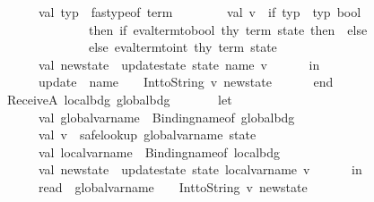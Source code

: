 \begin{isabellebody}
\ \ \ \ \ \ \ \ val\ typ\ {\isacharequal}{\kern0pt}\ fastype{\isacharunderscore}{\kern0pt}of\ term\isanewline
\ \ \ \ \ \ \ \ val\ v\ {\isacharequal}{\kern0pt}\ if\ typ\ {\isacharequal}{\kern0pt}\ {\isacharat}{\kern0pt}{\isacharbraceleft}{\kern0pt}typ\ bool{\isacharbraceright}{\kern0pt}\isanewline
\ \ \ \ \ \ \ \ \ \ \ \ \ \ \ \ then\ if\ eval{\isacharunderscore}{\kern0pt}term{\isacharunderscore}{\kern0pt}to{\isacharunderscore}{\kern0pt}bool\ thy\ term\ state\ then\ {}\ else\ {}\isanewline
\ \ \ \ \ \ \ \ \ \ \ \ \ \ \ \ else\ eval{\isacharunderscore}{\kern0pt}term{\isacharunderscore}{\kern0pt}to{\isacharunderscore}{\kern0pt}int\ thy\ term\ state\isanewline
\ \ \ \ \ \ \ \ val\ new{\isacharunderscore}{\kern0pt}state\ {\isacharequal}{\kern0pt}\ update{\isacharunderscore}{\kern0pt}state\ state\ name\ v\isanewline
\ \ \ \ \ \ in\isanewline
\ \ \ \ \ \ \ \ {\isacharparenleft}{\kern0pt}{\isachardoublequote}{\kern0pt}update{\isacharunderscore}{\kern0pt}{\isachardoublequote}{\kern0pt}\ {\isacharcircum}{\kern0pt}\ name\ {\isacharcircum}{\kern0pt}\ {\isachardoublequote}{\kern0pt}{\isacharbang}{\kern0pt}{\isachardoublequote}{\kern0pt}\ {\isacharcircum}{\kern0pt}\ Int{\isachardot}{\kern0pt}toString\ v{\isacharcomma}{\kern0pt}\ new{\isacharunderscore}{\kern0pt}state{\isacharparenright}{\kern0pt}\isanewline
\ \ \ \ \ \ end\isanewline
\ \ {\isacharbar}{\kern0pt}\ ReceiveA\ {\isacharparenleft}{\kern0pt}local{\isacharunderscore}{\kern0pt}bdg{\isacharcomma}{\kern0pt}\ global{\isacharunderscore}{\kern0pt}bdg{\isacharparenright}{\kern0pt}\ {\isacharequal}{\kern0pt}{\isachargreater}{\kern0pt}\isanewline
\ \ \ \ \ \ let\isanewline
\ \ \ \ \ \ \ \ val\ global{\isacharunderscore}{\kern0pt}var{\isacharunderscore}{\kern0pt}name\ {\isacharequal}{\kern0pt}\ Binding{\isachardot}{\kern0pt}name{\isacharunderscore}{\kern0pt}of\ global{\isacharunderscore}{\kern0pt}bdg\isanewline
\ \ \ \ \ \ \ \ val\ v\ {\isacharequal}{\kern0pt}\ safe{\isacharunderscore}{\kern0pt}lookup\ global{\isacharunderscore}{\kern0pt}var{\isacharunderscore}{\kern0pt}name\ state\isanewline
\ \ \ \ \ \ \ \ val\ local{\isacharunderscore}{\kern0pt}var{\isacharunderscore}{\kern0pt}name\ {\isacharequal}{\kern0pt}\ Binding{\isachardot}{\kern0pt}name{\isacharunderscore}{\kern0pt}of\ local{\isacharunderscore}{\kern0pt}bdg\isanewline
\ \ \ \ \ \ \ \ val\ new{\isacharunderscore}{\kern0pt}state\ {\isacharequal}{\kern0pt}\ update{\isacharunderscore}{\kern0pt}state\ state\ local{\isacharunderscore}{\kern0pt}var{\isacharunderscore}{\kern0pt}name\ v\isanewline
\ \ \ \ \ \ in\isanewline
\ \ \ \ \ \ \ \ {\isacharparenleft}{\kern0pt}{\isachardoublequote}{\kern0pt}read{\isacharunderscore}{\kern0pt}{\isachardoublequote}{\kern0pt}\ {\isacharcircum}{\kern0pt}\ global{\isacharunderscore}{\kern0pt}var{\isacharunderscore}{\kern0pt}name\ {\isacharcircum}{\kern0pt}\ {\isachardoublequote}{\kern0pt}{\isacharbang}{\kern0pt}{\isachardoublequote}{\kern0pt}\ {\isacharcircum}{\kern0pt}\ Int{\isachardot}{\kern0pt}toString\ v{\isacharcomma}{\kern0pt}\ new{\isacharunderscore}{\kern0pt}state{\isacharparenright}{\kern0pt}\isanewline

\end{isabellebody}
